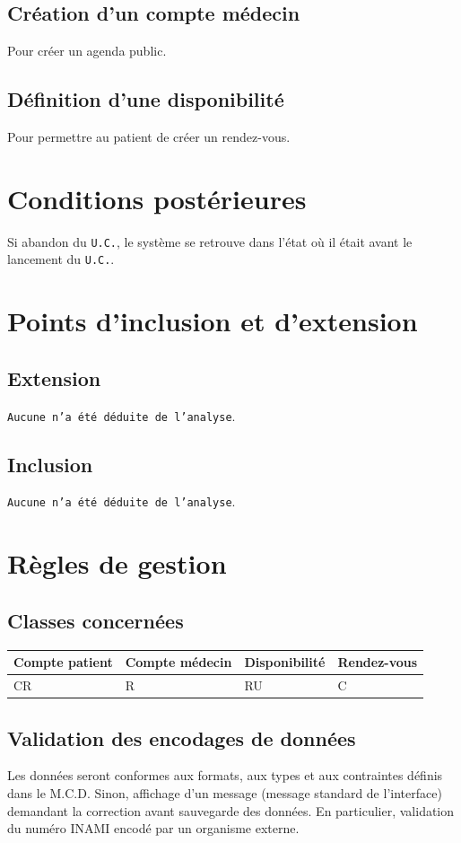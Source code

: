 \subsection{Création d'un compte médecin}
Pour créer un agenda public.
\subsection{Définition d'une disponibilité}
Pour permettre au patient de créer un rendez-vous.

\section{Conditions postérieures}
Si abandon du \texttt{U.C.}, le système se retrouve dans l'état où il était avant le
lancement du \texttt{U.C.}.
\newpage

\section{Points d'inclusion et d'extension}
\subsection{Extension}
\texttt{Aucune n'a été déduite de l'analyse}.
\subsection{Inclusion}
\texttt{Aucune n'a été déduite de l'analyse}.
\newpage

\section{Règles de gestion}
\subsection{Classes concernées}
\begin{center}
	\begin{longtable}{|p{2.2cm}|p{2.2cm}|p{2.2cm}|p{2.2cm}|}
		\hline
		 Compte patient & Compte médecin & Disponibilité & Rendez-vous \\
		\hline
		 CR & R & RU & C \\
		\hline
	\end{longtable}
\end{center}
\subsection{Validation des encodages de données}
Les données seront conformes aux formats, aux types et aux contraintes définis
dans le M.C.D. Sinon, affichage d’un message (message standard de l'interface) 
demandant la correction avant sauvegarde des données.
En particulier, validation du numéro INAMI encodé par un organisme externe.

